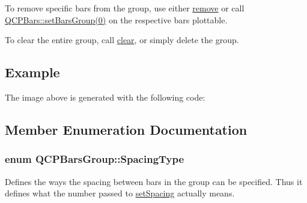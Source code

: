 To remove specific bars from the group, use either \hyperlink{classQCPBarsGroup_a215e28a5944f1159013a0e19169220e7}{remove} or call \hyperlink{classQCPBars_aedd1709061f0b307c47ddb45e172ef9a}{Q\+C\+P\+Bars\+:\+:set\+Bars\+Group(0)} on the respective bars plottable.

To clear the entire group, call \hyperlink{classQCPBarsGroup_a3ddf23928c6cd89530bd34ab7ba7b177}{clear}, or simply delete the group.\hypertarget{classQCPBarsGroup_qcpbarsgroup-example}{}\subsection{Example}\label{classQCPBarsGroup_qcpbarsgroup-example}
The image above is generated with the following code\+: 
\begin{DoxyCodeInclude}
\end{DoxyCodeInclude}


\subsection{Member Enumeration Documentation}
\subsubsection[{\texorpdfstring{Spacing\+Type}{SpacingType}}]{\setlength{\rightskip}{0pt plus 5cm}enum {\bf Q\+C\+P\+Bars\+Group\+::\+Spacing\+Type}}\hypertarget{classQCPBarsGroup_a4c0521120a97e60bbca37677a37075b6}{}\label{classQCPBarsGroup_a4c0521120a97e60bbca37677a37075b6}
Defines the ways the spacing between bars in the group can be specified. Thus it defines what the number passed to \hyperlink{classQCPBarsGroup_aa553d327479d72a0c3dafcc724a190e2}{set\+Spacing} actually means.

